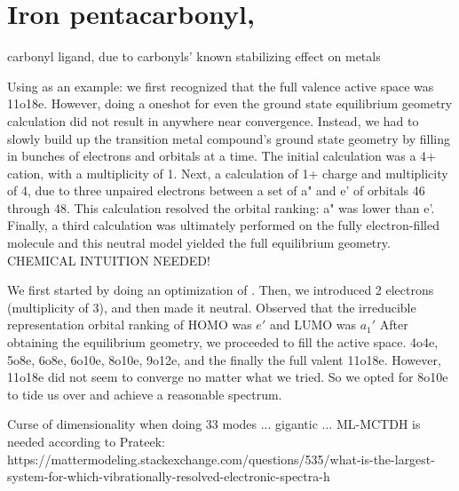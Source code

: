 
\section{Iron pentacarbonyl, }
carbonyl ligand, due to carbonyls' known stabilizing effect on metals

    Using  as an example: we first recognized that the full valence active space was 11o18e. However, doing a oneshot for even the ground state equilibrium geometry calculation did not result in anywhere near convergence. Instead, we had to slowly build up the transition metal compound's ground state geometry by filling in bunches of electrons and orbitals at a time. The initial calculation was a 4+ cation, with a multiplicity of 1. Next, a calculation of 1+ charge and multiplicity of 4, due to three unpaired electrons between a set of a" and e' of orbitals 46 through 48. This calculation resolved the orbital ranking: a" was lower than e'. Finally, a third calculation was ultimately performed on the fully electron-filled molecule and this neutral model yielded the full equilibrium geometry. CHEMICAL INTUITION NEEDED!
    
    We first started by doing an optimization of . Then, we introduced 2 electrons (multiplicity of 3), and then made it neutral. Observed that the irreducible representation orbital ranking of HOMO was $e'$ and LUMO was $a_{1}'$ After obtaining the equilibrium geometry, we proceeded to fill the active space. 4o4e, 5o8e, 6o8e, 6o10e, 8o10e, 9o12e, and the finally the full valent 11o18e. However, 11o18e did not seem to converge no matter what we tried. So we opted for 8o10e to tide us over and achieve a reasonable spectrum.

    Curse of dimensionality when doing 33 modes ... gigantic ... ML-MCTDH is needed according to Prateek: https://mattermodeling.stackexchange.com/questions/535/what-is-the-largest-system-for-which-vibrationally-resolved-electronic-spectra-h \\

